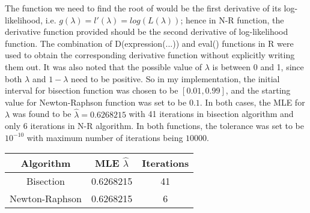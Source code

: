 \documentclass[12pt]{article}
\begin{document}
The function we need to find the root of would be the first derivative of its log-likelihood, i.e. $g(\lambda) = l'(\lambda) = log(L(\lambda))$; hence in N-R function, the derivative function provided should be the second derivative of log-likelihood function. The combination of D(expression(...)) and eval() functions in R were used to obtain the corresponding derivative function without explicitly writing them out. It was also noted that the possible value of $\lambda$ is between 0 and 1, since both $\lambda$ and $1-\lambda$ need to be positive. So in my implementation, the initial interval for bisection function was chosen to be $[0.01, 0.99]$, and the starting value for Newton-Raphson function was set to be $0.1$. In both cases, the MLE for $\lambda$ was found to be $\hat \lambda = 0.6268215$ with 41 iterations in bisection algorithm and only 6 iterations in N-R algorithm. In both functions, the tolerance was set to be $10^{-10}$ with maximum number of iterations being $10000$. \newline
\begin{center}
\begin{tabular}{|c|c|c|}
	\hline
	Algorithm & MLE $\hat \lambda$ & Iterations \\
	\hline
	Bisection & 0.6268215 & 41 \\
	\hline
	Newton-Raphson & 0.6268215 & 6 \\
	\hline
\end{tabular}
\end{center}
\end{document}
